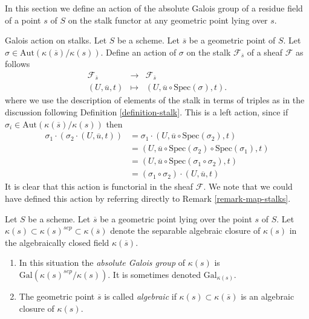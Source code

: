 \noindent
In this section we define an action of the absolute Galois group of a residue
field of a point $s$ of $S$ on the stalk functor at any geometric point lying
over $s$.

\medskip\noindent
Galois action on stalks.
Let $S$ be a scheme.
Let $\overline{s}$ be a geometric point of $S$.
Let $\sigma \in \text{Aut}(\kappa(\overline{s})/\kappa(s))$.
Define an action of $\sigma$ on the stalk $\mathcal{F}_{\overline{s}}$
of a sheaf $\mathcal{F}$ as follows
\begin{equation}
\label{equation-galois-action}
\begin{matrix}
\mathcal{F}_{\overline{s}} &
\longrightarrow &
\mathcal{F}_{\overline{s}} \\
(U, \overline{u}, t) &
\longmapsto &
(U, \overline{u} \circ \text{Spec}(\sigma), t).
\end{matrix}
\end{equation}
where we use the description of elements of the stalk in terms of triples
as in the discussion following
Definition \ref{definition-stalk}.
This is a left action, since if
$\sigma_i \in \text{Aut}(\kappa(\overline{s})/\kappa(s))$
then
\begin{align*}
\sigma_1 \cdot (\sigma_2 \cdot (U, \overline{u}, t))
& =
\sigma_1 \cdot (U, \overline{u} \circ \text{Spec}(\sigma_2), t) \\
& =
(U, \overline{u} \circ \text{Spec}(\sigma_2) \circ \text{Spec}(\sigma_1), t) \\
& =
(U, \overline{u} \circ \text{Spec}(\sigma_1 \circ \sigma_2), t) \\
& =
(\sigma_1 \circ \sigma_2) \cdot (U, \overline{u}, t)
\end{align*}
It is clear that this action is functorial in the sheaf $\mathcal{F}$.
We note that we could have defined this action by referring directly to
Remark \ref{remark-map-stalks}.

\begin{definition}
\label{definition-algebraic-geometric-point}
Let $S$ be a scheme.
Let $\overline{s}$ be a geometric point lying over the point $s$ of $S$.
Let $\kappa(s) \subset \kappa(s)^{sep} \subset \kappa(\overline{s})$
denote the separable algebraic closure of $\kappa(s)$ in the algebraically
closed field $\kappa(\overline{s})$.
\begin{enumerate}
\item In this situation the {\it absolute Galois group} of $\kappa(s)$
is $\text{Gal}(\kappa(s)^{sep}/\kappa(s))$. It is sometimes denoted
$\text{Gal}_{\kappa(s)}$.
\item The geometric point $\overline{s}$ is called
{\it algebraic} if $\kappa(s) \subset \kappa(\overline{s})$ is
an algebraic closure of $\kappa(s)$.
\end{enumerate}
\end{definition}

